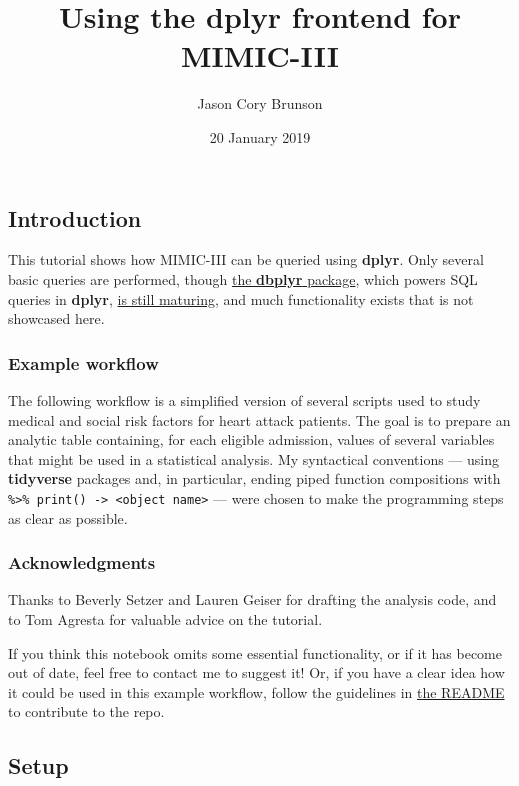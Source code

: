 \documentclass[]{article}
\title{Using the \textbf{dplyr} frontend for MIMIC-III}
\author{Jason Cory Brunson}
\date{20 January 2019}
\begin{document}
\maketitle

\subsection{Introduction}\label{introduction}

This tutorial shows how MIMIC-III can be queried using \textbf{dplyr}.
Only several basic queries are performed, though
\href{https://dbplyr.tidyverse.org/}{the \textbf{dbplyr} package}, which
powers SQL queries in \textbf{dplyr},
\href{https://github.com/tidyverse/dbplyr/issues}{is still maturing},
and much functionality exists that is not showcased here.

\subsubsection{Example workflow}\label{example-workflow}

The following workflow is a simplified version of several scripts used
to study medical and social risk factors for heart attack patients. The
goal is to prepare an analytic table containing, for each eligible
admission, values of several variables that might be used in a
statistical analysis. My syntactical conventions --- using
\textbf{tidyverse} packages and, in particular, ending piped function
compositions with
\texttt{\%\textgreater{}\%\ print()\ -\textgreater{}\ \textless{}object\ name\textgreater{}}
--- were chosen to make the programming steps as clear as possible.

\subsubsection{Acknowledgments}\label{acknowledgments}

Thanks to Beverly Setzer and Lauren Geiser for drafting the analysis
code, and to Tom Agresta for valuable advice on the tutorial.

If you think this notebook omits some essential functionality, or if it
has become out of date, feel free to contact me to suggest it! Or, if
you have a clear idea how it could be used in this example workflow,
follow the guidelines in
\href{https://github.com/MIT-LCP/mimic-code}{the README} to contribute
to the repo.

\subsection{Setup}\label{setup}
\end{document}
